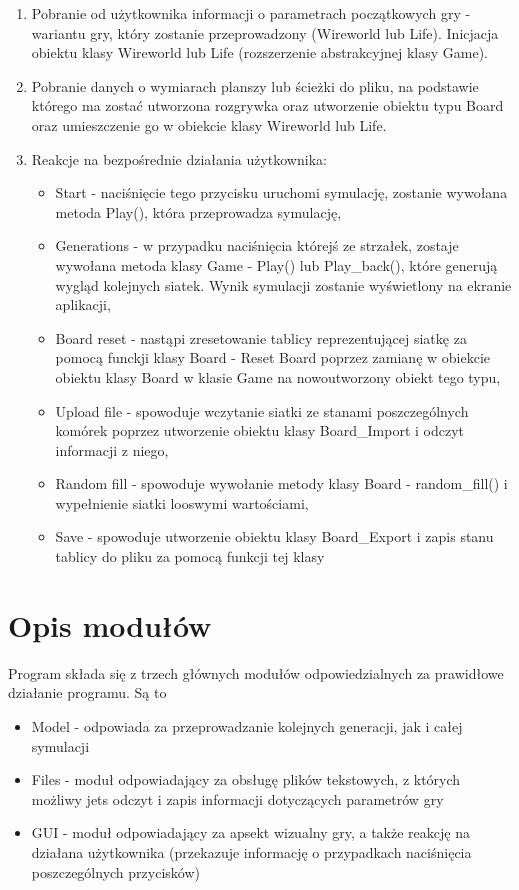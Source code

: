 \documentclass[10pt, oneside]{article}
\begin{document}
\begin{enumerate}
\item Pobranie od użytkownika informacji o parametrach początkowych gry - wariantu gry, który zostanie przeprowadzony (Wireworld lub Life). Inicjacja obiektu klasy Wireworld lub Life (rozszerzenie abstrakcyjnej klasy Game).
\item  Pobranie danych o wymiarach planszy lub ścieżki do pliku, na podstawie którego ma zostać utworzona rozgrywka oraz utworzenie obiektu typu Board oraz umieszczenie go w obiekcie klasy Wireworld lub Life.
\item Reakcje na bezpośrednie działania użytkownika:
	\begin {itemize}
	\item Start -  naciśnięcie tego przycisku uruchomi symulację, zostanie wywołana metoda Play(), która przeprowadza symulację,
	\item Generations - w przypadku naciśnięcia którejś ze strzałek, zostaje wywołana metoda klasy Game -  Play() lub Play\_back(), które generują wygląd kolejnych siatek. Wynik symulacji 			zostanie wyświetlony na ekranie aplikacji,
	\item Board reset - nastąpi zresetowanie tablicy reprezentującej siatkę za pomocą funckji klasy Board - Reset Board poprzez zamianę w obiekcie obiektu klasy Board w klasie Game na nowoutworzony obiekt tego typu,
	\item Upload file - spowoduje wczytanie siatki ze stanami poszczególnych komórek poprzez utworzenie obiektu klasy Board\_Import  i odczyt informacji z niego,
	\item Random fill -  spowoduje wywołanie metody klasy Board - random\_fill() i  wypełnienie siatki looswymi wartościami,
	\item Save - spowoduje utworzenie obiektu klasy Board\_Export i zapis stanu tablicy do pliku za pomocą funkcji tej klasy
\end{itemize}
\end {enumerate}



\section {Opis modułów}
Program składa się z trzech głównych modułów odpowiedzialnych za prawidłowe działanie programu. Są to
\begin {itemize}
\item Model -  odpowiada za przeprowadzanie kolejnych generacji, jak i całej symulacji
\item Files - moduł odpowiadający za obsługę plików tekstowych, z których możliwy jets odczyt i zapis informacji dotyczących parametrów gry
\item GUI - moduł odpowiadający za apsekt wizualny gry, a także reakcję na działana użytkownika (przekazuje informację o przypadkach naciśnięcia poszczególnych przycisków)
\end{itemize}
\end{document}
